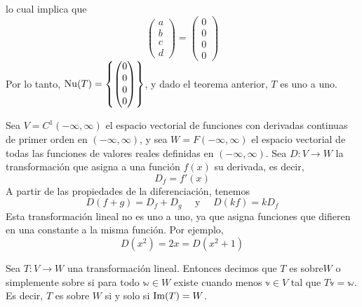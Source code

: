 \begin{example}
    lo cual implica que
    $$\begin{pmatrix}
        a \\
        b \\
        c \\
        d
    \end{pmatrix} = \begin{pmatrix}
        0 \\
        0 \\
        0 \\
        0
    \end{pmatrix}$$
    Por lo tanto, $\displaystyle \operatorname{Nu}(T) = \left\{ \begin{pmatrix}
        0 \\
        0 \\
        0 \\
        0
    \end{pmatrix} \right\}$, y dado el teorema anterior, $T$ es uno a uno.
\end{example}

\begin{example}
    Sea $V = C^1(-\infty, \infty)$ el espacio vectorial de funciones con derivadas continuas de primer orden en $(-\infty, \infty)$, y sea $W = F(-\infty, \infty)$ el espacio vectorial de todas las funciones de valores reales definidas en $(-\infty, \infty)$. Sea $D: V \longrightarrow W$ la transformación que asigna a una función $f(x)$ su derivada, es decir,
    $$D_f = f'(x)$$
    A partir de las propiedades de la diferenciación, tenemos
    $$D(f + g) = D_f + D_g \quad \text{ y } \quad D(kf) = kD_f$$
    Esta transformación lineal no es uno a uno, ya que asigna funciones que difieren en una constante a la misma función. Por ejemplo,
    $$D(x^2) = 2x = D(x^2 + 1)$$
\end{example}

\begin{definition}
    Sea $T: V \longrightarrow W$ una transformación lineal. Entonces decimos que $T$ es sobre$W$ o simplemente sobre si para todo $\mathbb{w} \in W$ existe cuando menos $\mathbb{v} \in V$ tal que $T\mathbb{v} = \mathbb{w}$. Es decir, $T$ es sobre $W$ si y solo si $\operatorname{Im}(T) = W$.
\end{definition}

